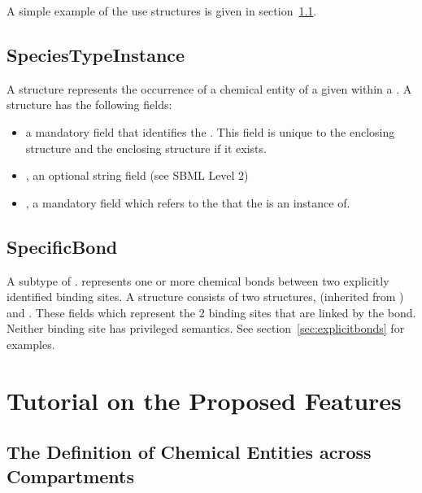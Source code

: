 \documentclass{cekarticle}
\begin{document}
A simple example of the use  structures is given in section~\ref{sec:commonspecies}.

\subsection{SpeciesTypeInstance}

A  structure represents the occurrence of a chemical entity of a given
 within a .  A  structure has the
following fields:

\begin{itemize}

\item {} a mandatory  field that identifies the .
This field is unique to the enclosing  structure and the enclosing
 structure if it exists.

\item {}, an optional string field (see SBML Level 2)

\item {}, a mandatory  field which refers to the 
that the  is an instance of.

\end{itemize}

\subsection{SpecificBond}

A subtype of .    represents one or more chemical bonds between
two explicitly identified binding sites.  A  structure consists of two
 structures,
 (inherited from ) and
.
These fields which represent the 2 binding sites that are linked by the bond.
Neither binding site has privileged semantics.
See section~\ref{sec:explicitbonds} for examples.

\section{Tutorial on the Proposed Features}

\subsection{The Definition of Chemical Entities across Compartments}
\label{sec:commonspecies}
\end{document}
